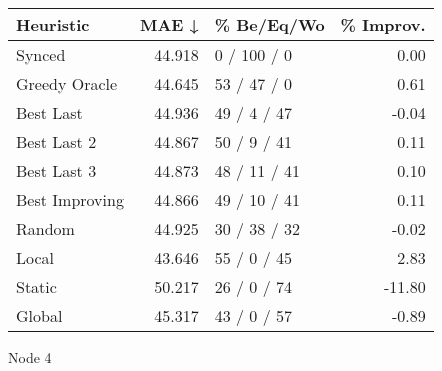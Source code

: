 \begin{tabular}{lrlr}
\toprule
\textbf{Heuristic} & \textbf{MAE ↓} & \textbf{\% Be/Eq/Wo} & \textbf{\% Improv.} \\
\midrule
            Synced &         44.918 &          0 / 100 / 0 &                0.00 \\
     Greedy Oracle &         44.645 &          53 / 47 / 0 &                0.61 \\
         Best Last &         44.936 &          49 / 4 / 47 &               -0.04 \\
       Best Last 2 &         44.867 &          50 / 9 / 41 &                0.11 \\
       Best Last 3 &         44.873 &         48 / 11 / 41 &                0.10 \\
    Best Improving &         44.866 &         49 / 10 / 41 &                0.11 \\
            Random &         44.925 &         30 / 38 / 32 &               -0.02 \\
             Local &         43.646 &          55 / 0 / 45 &                2.83 \\
            Static &         50.217 &          26 / 0 / 74 &              -11.80 \\
            Global &         45.317 &          43 / 0 / 57 &               -0.89 \\
\bottomrule
\end{tabular}
\caption{Node 4}
\label{tab:non_lr01_le1_bs2_4}
